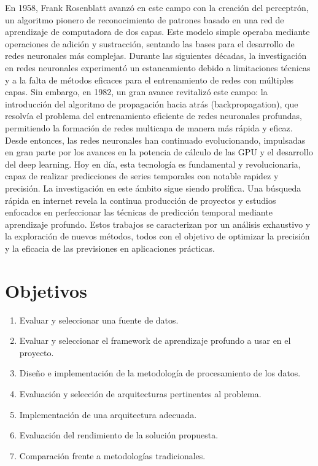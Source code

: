 En 1958, Frank Rosenblatt avanzó en este campo con la creación del perceptrón, un algoritmo pionero de reconocimiento de patrones basado en una red de aprendizaje de computadora de dos capas. Este modelo simple operaba mediante operaciones de adición y sustracción, sentando las bases para el desarrollo de redes neuronales más complejas.
Durante las siguientes décadas, la investigación en redes neuronales experimentó un estancamiento debido a limitaciones técnicas y a la falta de métodos eficaces para el entrenamiento de redes con múltiples capas. Sin embargo, en 1982, un gran avance revitalizó este campo: la introducción del algoritmo de propagación hacia atrás (backpropagation), que resolvía el problema del entrenamiento eficiente de redes neuronales profundas, permitiendo la formación de redes multicapa de manera más rápida y eficaz.
Desde entonces, las redes neuronales han continuado evolucionando, impulsadas en gran parte por los avances en la potencia de cálculo de las GPU y el desarrollo del deep learning. Hoy en día, esta tecnología es fundamental y revolucionaria, capaz de realizar predicciones de series temporales con notable rapidez y precisión.
La investigación en este ámbito sigue siendo prolífica. Una búsqueda rápida en internet revela la continua producción de proyectos y estudios enfocados en perfeccionar las técnicas de predicción temporal mediante aprendizaje profundo. Estos trabajos se caracterizan por un análisis exhaustivo y la exploración de nuevos métodos, todos con el objetivo de optimizar la precisión y la eficacia de las previsiones en aplicaciones prácticas.

\section{Objetivos}

\begin{enumerate}[label=\arabic*.] 
    \item Evaluar y seleccionar una fuente de datos.
    \item Evaluar y seleccionar el framework de aprendizaje profundo a usar en el proyecto.
    \item Diseño e implementación de la metodología de procesamiento de los datos.
    \item Evaluación y selección de arquitecturas pertinentes al problema.
    \item Implementación de una arquitectura adecuada.
    \item Evaluación del rendimiento de la solución propuesta.
    \item Comparación frente a metodologías tradicionales.
\end{enumerate}

\newpage
